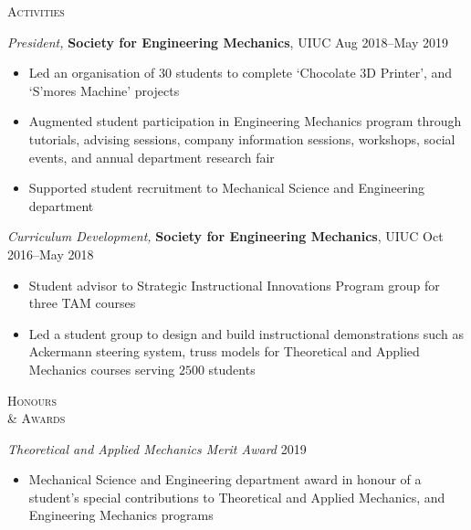 \documentclass[10pt]{article}
\begin{document}
\begin{multicols}{2}
\textsc{\small Activities}
\columnbreak

{\sl President,} \textbf{Society for Engineering Mechanics}, UIUC \hfill Aug 2018--May 2019

\vspace{-1.75em}
\begin{itemize}[label=-]
    \setlength\itemsep{-0.25em}
    \item Led an organisation of $30$ students to complete `Chocolate 3D Printer', and `S'mores Machine' projects
    \item Augmented student participation in Engineering Mechanics program through tutorials, advising sessions, company information sessions, workshops, social events, and annual department research fair
    \item Supported student recruitment to Mechanical Science and Engineering department
\end{itemize}
\vspace{-2.0em}

\vspace{0.5em}
%
{\sl Curriculum Development,} \textbf{Society for Engineering Mechanics}, UIUC \hfill Oct 2016--May 2018

\vspace{-1.75em}
\begin{itemize}[label=-]
    \setlength\itemsep{-0.25em}
    \item Student advisor to Strategic Instructional Innovations Program group for three TAM courses
    \item Led a student group to design and build instructional demonstrations such as  Ackermann steering system, truss models for Theoretical and Applied Mechanics courses serving $2500$ students
\end{itemize}
\vspace{-2.0em}

\end{multicols}
\vspace{-1.5em} 
\begin{multicols}{2}
\textsc{\small Honours \\ \& Awards}
\columnbreak

{\sl Theoretical and Applied Mechanics Merit Award} \hfill 2019

\vspace{-1.75em}
\begin{itemize}[label= ]
    \setlength\itemsep{-0.25em}
    \item  Mechanical Science and Engineering department award in honour of a student's special contributions to Theoretical and Applied Mechanics, and Engineering Mechanics programs
\end{itemize}
\vspace{-2.0em}

\end{multicols}
\end{document}
